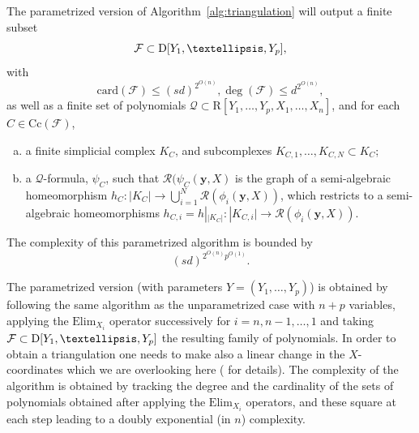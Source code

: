 \documentclass{amsart}[10pts]
\theoremstyle{definition}
\theoremstyle{remark}
\theoremstyle{observation}
\numberwithin{equation}{section}
\newcommand {\R} {\mathrm{R}}
\newcommand {\D}     {\mbox{\rm D}}
\newcommand {\RR} {{\mathcal R}}
\newcommand{\card}{\mathrm{card}}
\newcommand{\y}{\mathbf{y}}
\newcommand{\Cc}{\mathrm{Cc}}
\newcommand{\Elim}{\mathrm{Elim}}
\begin{document}
The parametrized version
of Algorithm~\ref{alg:triangulation} will
output a finite subset 
\[
\mathcal{F} \subset \D[Y_1,\ldots,Y_p],
\]
with 
\[
\card(\mathcal{F}) \leq (sd)^{2^{O(n)}}, \deg(\mathcal{F}) \leq d^{2^{O(n)}},
\]
as well as
a finite set of polynomials $\mathcal{Q} \subset \R[Y_1,\ldots,Y_p, X_1,\ldots,X_n]$, and for each $C \in \Cc(\mathcal{F})$,
\begin{enumerate}[(a)]
\item 
    a finite simplicial complex
    $K_C$, and subcomplexes $K_{C,1},\ldots,K_{C,N} \subset K_C$;
\item a $\mathcal{Q}$-formula, $\psi_C$, such that $\RR(\psi_C(\y,X)$ is the graph of a semi-algebraic homeomorphism $h_C:|K_C| \rightarrow \bigcup_{i=1}^N \RR(\phi_i(\y,X))$,
    which restricts to a semi-algebraic homeomorphisms 
    $h_{C,i} = h|_{|K_C|}: |K_{C,i}| \rightarrow \RR(\phi_i(\y,X))$.
    \end{enumerate}
The complexity of this parametrized algorithm is bounded by 
\begin{equation}
\label{eqn:complexity:triangulation}
(sd)^{2^{O(n)} p^{O(1)}}.
\end{equation}

The parametrized version (with parameters $Y = (Y_1,\ldots,Y_p)$) is obtained by following the same algorithm as the unparametrized case
with $n+p$ variables, applying the $\Elim_{X_i}$ operator successively
for $i=n,n-1,\ldots,1$ and taking $\mathcal{F} \subset \D[Y_1,\ldots,Y_p]$ the resulting family of polynomials. In order to obtain a triangulation one needs to make also a linear change in the
$X$-coordinates which we are overlooking here (\cite[Chapter 5]{BPRbook2} for details). The complexity of the algorithm is obtained by tracking the degree and the cardinality of the sets of polynomials obtained after applying the $\Elim_{X_i}$ operators, and these square at each step leading to a doubly exponential (in $n$) complexity.
\end{document}
